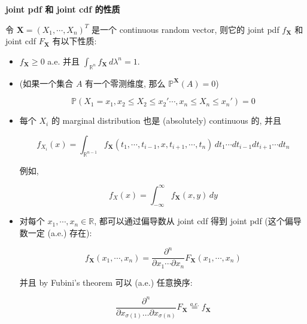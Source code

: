 \documentclass{qlnotes-export}
\begin{document}
\begin{proposition}{\protect{}\label{kn-joint-pdf-joint-cdf}{\textbf{joint pdf
和 joint cdf 的性质}}}

令 \(\mathbf{X} = (X_{1},\cdots,X_{n})^{T}\) 是一个 continuous random vector, 则它的 joint pdf \(f_{\mathbf{X}}\) 和 joint cdf \(F_{\mathbf{X}}\) 有以下性质:

\begin{itemize}
\item
  \(f_{\mathbf{X}} \geq 0\) a.e. 并且 \(\int_{{\mathbb{R}}^{n}}f_{\mathbf{X}}\, d\lambda^{n} = 1\).
\item
  (如果一个集合 \(A\) 有一个零测维度, 那么 \({\mathbb{P}}^{\mathbf{X}}(A) = 0\))

  \[{\mathbb{P}}(X_{1} = x_{1},x_{2} \leq X_{2} \leq x_{2}'\cdots,x_{n} \leq X_{n} \leq x_{n}') = 0\]
\item
  每个 \(X_{i}\) 的 marginal distribution 也是 (absolutely) continuous 的, 并且

  \[f_{X_{i}}(x) = \int_{{\mathbb{R}}^{n - 1}}f_{\mathbf{X}}(t_{1},\cdots,t_{i - 1},x,t_{i + 1},\cdots,t_{n})\, dt_{1}\cdots dt_{i - 1}dt_{i + 1}\cdots dt_{n}\]

  例如,

  \[f_{X}(x) = \int_{- \infty}^{\infty}f_{\mathbf{X}}(x,y)\, dy\]
\item
  对每个 \(x_{1},\cdots,x_{n} \in {\mathbb{R}}\), 都可以通过偏导数从 joint cdf 得到 joint pdf (这个偏导数一定 (a.e.) 存在):

  \[f_{\mathbf{X}}(x_{1},\cdots,x_{n}) = \frac{\partial^{n}}{\partial x_{1}\cdots\partial x_{n}}F_{\mathbf{X}}(x_{1},\cdots,x_{n})\]

  并且 by Fubini's theorem 可以 (a.e.) 任意换序:

  \[\frac{\partial^{n}}{\partial x_{\sigma(1)}\ldots\partial x_{\sigma(n)}}F_{\mathbf{X}}\overset{a.e.}{=}f_{\mathbf{X}}\]
\end{itemize}

\end{proposition}
\end{document}
